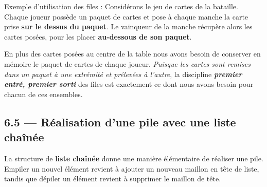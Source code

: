 \documentclass[a4paper,17pt]{extarticle}
\begin{document}
    Exemple d'utilisation des files : Considérons le jeu de cartes de la
bataille. Chaque joueur possède un paquet de cartes et pose à chaque
manche la carte prise \textbf{sur le dessus du paquet}. Le vainqueur de
la manche récupère alors les cartes posées, pour les placer
\textbf{au-dessous de son paquet}.

En plus des cartes posées au centre de la table nous avons besoin de
conserver en mémoire le paquet de cartes de chaque joueur. \emph{Puisque
les cartes sont remises dans un paquet à une extrémité et prélevées à
l'autre}, la discipline \textbf{\emph{premier entré, premier sorti}} des
files est exactement ce dont nous avons besoin pour chacun de ces
ensembles.

    \hypertarget{ruxe9alisation-dune-pile-avec-une-liste-chauxeenuxe9e}{%
\subsection{6.5 --- Réalisation d'une pile avec une liste
chaînée}\label{ruxe9alisation-dune-pile-avec-une-liste-chauxeenuxe9e}}

    La structure de \textbf{liste chaînée} donne une manière élémentaire de
réaliser une pile. Empiler un nouvel élément revient à ajouter un
nouveau maillon en tête de liste, tandis que dépiler un élément revient
à supprimer le maillon de tête.
\end{document}
